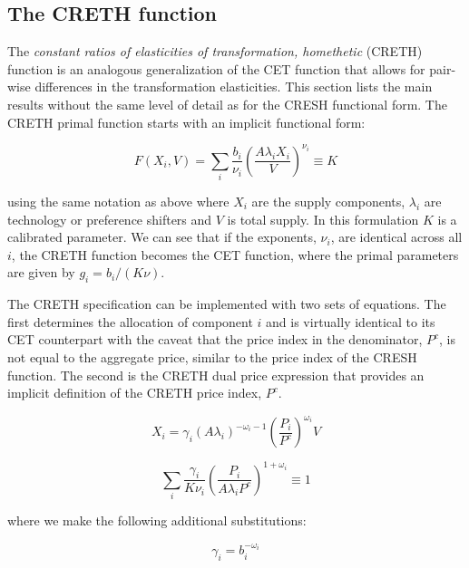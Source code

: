 \subsection{The CRETH function}

The \emph{constant ratios of elasticities of transformation, homethetic} (CRETH) function is an
analogous generalization of the CET function that allows for pair-wise
differences in the transformation elasticities. This section lists the main
results without the same level of detail as for the CRESH functional form.
The CRETH primal function starts with an implicit functional form:

\begin{equation}
\label{eq:crethprimal}
F(X_i,V) = \sum\limits_{i}{ \frac{b_i}{\nu_i}\left( \frac{A \lambda_i X_i}{V}\right)^{\nu_i}} \equiv K
\end{equation}

\noindent using the same notation as above where $X_i$ are the supply components, $\lambda_i$ are technology
or preference shifters and $V$ is total supply. In this formulation $K$ is a calibrated parameter. We can
see that if the exponents, $\nu_i$, are identical across all $i$, the CRETH function becomes the CET
function, where the primal parameters are given by $g_i=b_i/(K \nu)$.

The CRETH specification can be implemented with two sets of equations. The first determines the allocation of component $i$ and is virtually identical
to its CET counterpart with the caveat that the price index in the
denominator, $P^c$, is not equal to the aggregate price, similar to
the price index of the CRESH function. The second is the CRETH dual
price expression that provides an implicit definition of the
CRETH price index, $P^c$.

\begin{equation}
\label{eq:crethx}
X_i = \gamma_i \left( A \lambda_i\right)^{-\omega_i-1} \left( \frac{P_i} {P^c} \right)^{\omega_i} V
\end{equation}

\begin{equation}
\label{eq:crethDual}
\sum\limits_{i} { \frac{\gamma_i}{K \nu_i}\left( \frac {P_i} {A \lambda_i P^c}\right)^{1+\omega_i}} \equiv 1
\end{equation}

\noindent where we make the following additional substitutions:

\begin{displaymath}
\gamma_i = b_i^{-\omega_i}
\end{displaymath}

